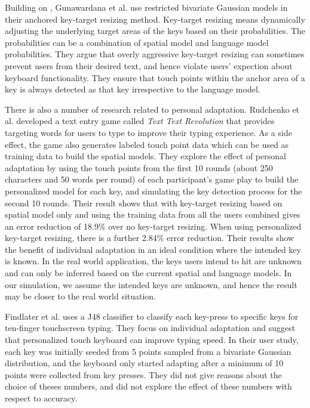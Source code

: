 \documentclass{sigchi}
\begin{document}
Building on \cite{Goodman:2002}, Gunawardana et al. \cite{Gunawardana:2010} use restricted bivariate Gaussian
models in their anchored key-target resizing method. Key-target resizing means dynamically
adjusting the underlying target areas of the keys based on their probabilities. The probabilities can 
be a combination of spatial model and language model probabilities.
They argue that overly aggressive
key-target resizing can sometimes prevent users from their desired text, and hence violate
users' expection about keyboard functionality. They ensure that touch points within
the anchor area of a key is always detected as that key irrespective to the language model.

There is also a number of research related to personal adaptation. 
Rudchenko et al. \cite{Rudchenko:2011}
developed a text entry game called \textit{Text Text Revolution} that provides 
targeting words for users to type to improve their typing experience. As a side effect,
the game also generates labeled touch point data which can be used as
training data to build the spatial models. They explore the effect of personal adaptation
by using the touch points from the first 10 rounds (about 250 characters and 50 words per round) of each 
participant's game play to build the personalized model for each key, and simulating the key detection
process for the second 10 rounds. Their result shows that with key-target resizing based on
spatial model only and using the training data from all the users combined
gives an error reduction of 18.9\% over no key-target resizing. When using personalized
key-target resizing, there is a further 2.84\% error reduction.
Their results show the benefit of individual adaptation in an ideal condition where the 
intended key is known. In the real world application, the keys users intend to hit are unknown and
can only be inferred based on the current spatial and language models. In our simulation, we assume the 
intended keys are unknown, and hence the result may be closer to the real world situation. 

Findlater et al. \cite{Findlater:2012} uses a J48 classifier to classify
each key-press to specific keys for ten-finger touchscreen typing. They
focus on individual adaptation and suggest that personalized touch keyboard
 can improve typing speed.  
In their user study, each key was initially seeded from 5 points sampled from
a bivariate Gaussian distribution, and the keyboard only started adapting
after a minimum of 10 points were collected from key presses. They did not
give reasons about the choice of theses numbers, and did not explore the
effect of these numbers with respect to accuracy. 
\end{document}
